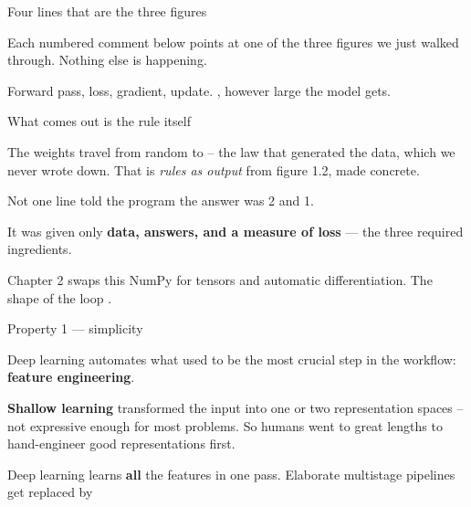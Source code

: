 \documentclass[aspectratio=169,11pt,t]{beamer}
\begin{document}
\begin{frame}[shrink=25]{Four lines that are the three figures}
{\fontsize{9.4}{12.6}\selectfont\color{fg2}Each numbered comment below points at one of the three figures we just walked through. Nothing else is happening.\par}\vskip 4pt
\begin{iband}[signal]
Forward pass, loss, gradient, update. , however large the model gets.
\end{iband}
\end{frame}

\begin{frame}[shrink=25]{What comes out is the rule itself}
\begin{iband}[signal]
The weights travel from random to  -- the law that generated the data, which we never wrote down. That is \textit{rules as output} from figure 1.2, made concrete.
\end{iband}
\begin{ibullets}
\item Not one line told the program the answer was 2 and 1.
\item It was given only \textbf{data, answers, and a measure of loss} --- the three required ingredients.
\item Chapter 2 swaps this NumPy for tensors and automatic differentiation. The shape of the loop .
\end{ibullets}
\end{frame}


\begin{frame}[shrink=25]{Property 1 --- simplicity}
{\fontsize{9.4}{12.6}\selectfont\color{fg2}Deep learning automates what used to be the most crucial step in the workflow: \textbf{feature engineering}.\par}\vskip 4pt
\begin{minipage}[t]{0.485\textwidth}
{\fontsize{9.4}{12.6}\selectfont\color{fg2}\textbf{Shallow learning} transformed the input into one or two representation spaces -- not expressive enough for most problems. So humans went to great lengths to hand-engineer good representations first.\par}\vskip 4pt

\end{minipage}%
\hfill
\begin{minipage}[t]{0.485\textwidth}
\begin{iband}[signal]
Deep learning learns \textbf{all} the features in one pass. Elaborate multistage pipelines get replaced by 
\end{iband}

\end{minipage}%
\end{frame}
\end{document}
